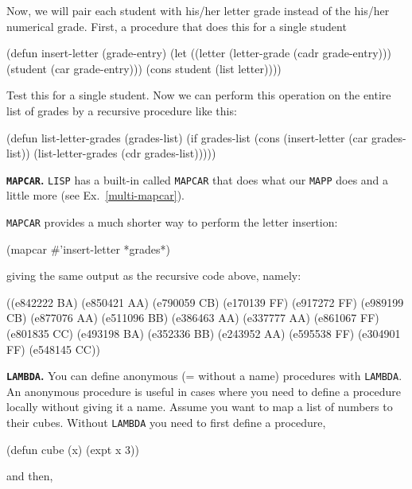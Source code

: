 \documentclass[a4paper,11pt]{article}
\begin{document}
\begin{uenum}
Now, we will pair each student with his/her letter grade instead of the his/her numerical grade. First, a procedure that does this for a single student 

\begin{lispcode}
(defun insert-letter (grade-entry)
  (let ((letter (letter-grade (cadr grade-entry)))
        (student (car grade-entry)))
    (cons student (list letter))))
\end{lispcode}

Test this for a single student. Now we can perform this operation on the entire list of grades by a recursive procedure like this:

\begin{lispcode}
(defun list-letter-grades (grades-list)
  (if grades-list
    (cons
      (insert-letter (car grades-list))
      (list-letter-grades (cdr grades-list)))))
\end{lispcode}

\item {\bf \Verb+MAPCAR+.} \Verb+LISP+ has a built-in called \Verb+MAPCAR+ that does what our \Verb+MAPP+ does and a little more (see Ex.\ \ref{multi-mapcar}). 

\Verb+MAPCAR+ provides a much shorter way to perform the letter insertion:

\begin{lispcode}
(mapcar #'insert-letter *grades*)
\end{lispcode}
giving the same output as the recursive code above, namely:

\begin{lispcode}
((e842222 BA) (e850421 AA) (e790059 CB) (e170139 FF)
 (e917272 FF) (e989199 CB) (e877076 AA) (e511096 BB)
 (e386463 AA) (e337777 AA) (e861067 FF) (e801835 CC)
 (e493198 BA) (e352336 BB) (e243952 AA) (e595538 FF)
 (e304901 FF) (e548145 CC))
\end{lispcode}

\item {\bf \Verb+LAMBDA+.} You can define anonymous (= without a name) procedures with \Verb+LAMBDA+. An anonymous procedure is useful in cases where you need to define a procedure locally without giving it a name. Assume you want to map a list of numbers to their cubes. Without \Verb+LAMBDA+ you need to first define a procedure,

\begin{lispcode}
(defun cube (x)
  (expt x 3))
\end{lispcode}

and then,


\end{uenum}
\end{document}
